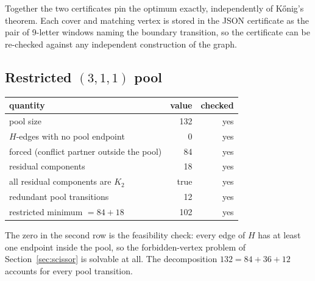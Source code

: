 Together the two certificates pin the optimum exactly, independently of
K\H{o}nig's theorem. Each cover and matching vertex is stored in the JSON
certificate as the pair of 9-letter windows naming the boundary transition, so
the certificate can be re-checked against any independent construction of the
graph.

\subsection*{Restricted \texorpdfstring{\((3,1,1)\)}{(3,1,1)} pool}

\begin{center}
\begin{tabular}{lrr}
\toprule
quantity & value & checked \\
\midrule
pool size & 132 & yes \\
\(H\)-edges with no pool endpoint & 0 & yes \\
forced (conflict partner outside the pool) & 84 & yes \\
residual components & 18 & yes \\
all residual components are \(K_2\) & true & yes \\
redundant pool transitions & 12 & yes \\
restricted minimum \(=84+18\) & 102 & yes \\
\bottomrule
\end{tabular}
\end{center}

The zero in the second row is the feasibility check: every edge of \(H\) has at
least one endpoint inside the pool, so the forbidden-vertex problem of
Section~\ref{sec:scissor} is solvable at all. The decomposition
\(132=84+36+12\) accounts for every pool transition.
